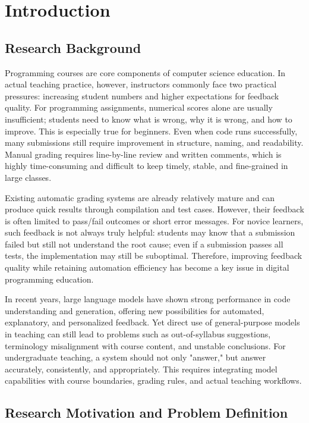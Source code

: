 ﻿\chapter{Introduction}


\section{Research Background}

Programming courses are core components of computer science education. In actual teaching practice, however, instructors commonly face two practical pressures: increasing student numbers and higher expectations for feedback quality. For programming assignments, numerical scores alone are usually insufficient; students need to know what is wrong, why it is wrong, and how to improve. This is especially true for beginners. Even when code runs successfully, many submissions still require improvement in structure, naming, and readability. Manual grading requires line-by-line review and written comments, which is highly time-consuming and difficult to keep timely, stable, and fine-grained in large classes.

Existing automatic grading systems are already relatively mature and can produce quick results through compilation and test cases. However, their feedback is often limited to pass/fail outcomes or short error messages. For novice learners, such feedback is not always truly helpful: students may know that a submission failed but still not understand the root cause; even if a submission passes all tests, the implementation may still be suboptimal. Therefore, improving feedback quality while retaining automation efficiency has become a key issue in digital programming education.

In recent years, large language models have shown strong performance in code understanding and generation, offering new possibilities for automated, explanatory, and personalized feedback. Yet direct use of general-purpose models in teaching can still lead to problems such as out-of-syllabus suggestions, terminology misalignment with course content, and unstable conclusions. For undergraduate teaching, a system should not only "answer," but answer accurately, consistently, and appropriately. This requires integrating model capabilities with course boundaries, grading rules, and actual teaching workflows.

\section{Research Motivation and Problem Definition}

